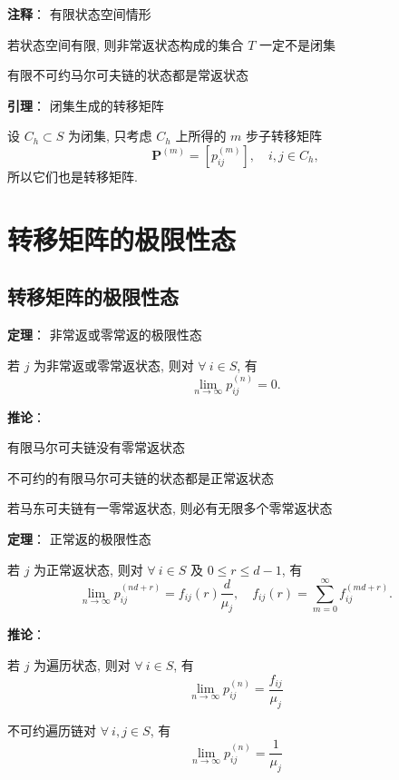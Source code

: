 \documentclass[openany]{ctexbook}
\theoremstyle{kaiti}
\theoremstyle{normal}
\begin{document}
\textbf{注释}： 有限状态空间情形

若状态空间有限, 则非常返状态构成的集合 $T$ 一定不是闭集

有限不可约马尔可夫链的状态都是常返状态

\textbf{引理}： 闭集生成的转移矩阵

设 $C_h\subset S$ 为闭集, 只考虑 $C_h$ 上所得的 $m$ 步子转移矩阵 
\begin{equation}
  \bm{P}^{(m)}=[p_{ij}^{(m)}],\quad i,j\in C_h,
\end{equation}
所以它们也是转移矩阵.

\section{转移矩阵的极限性态}

\subsection{转移矩阵的极限性态}

\textbf{定理}： 非常返或零常返的极限性态

若 $j$ 为非常返或零常返状态, 则对 $\forall~i\in S$, 有
\begin{equation}
  \lim_{n\to\infty}p_{ij}^{(n)}=0.
\end{equation}

\textbf{推论}：

有限马尔可夫链没有零常返状态

不可约的有限马尔可夫链的状态都是正常返状态

若马东可夫链有一零常返状态, 则必有无限多个零常返状态

\textbf{定理}： 正常返的极限性态

若 $j$ 为正常返状态, 则对 $\forall~i\in S$ 及 $0\leqslant r\leqslant d-1$, 有
\begin{equation}
  \lim_{n\to\infty}p_{ij}^{(nd+r)}=f_{ij}(r)\frac{d}{\mu_j},\quad f_{ij}(r)=\sum_{m=0}^\infty f_{ij}^{(md+r)}.
\end{equation}

\textbf{推论}：

若 $j$ 为遍历状态, 则对 $\forall~i\in S$, 有
\begin{equation}
  \lim_{n\to\infty}p_{ij}^{(n)}=\frac{f_{ij}}{\mu_j}
\end{equation}

不可约遍历链对 $\forall~i,j\in S$, 有
\begin{equation}
  \lim_{n\to\infty}p_{ij}^{(n)}=\frac{1}{\mu_j}
\end{equation}
\end{document}

